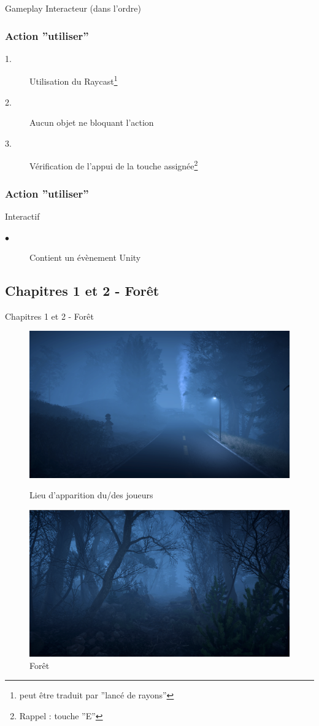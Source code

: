 \begin{frame}{Gameplay}
\setlength{\parindent}{5ex}
Interacteur (dans l'ordre)
\frametitle{Action ''utiliser''}
\begin{description}
  \item[1.] Utilisation du Raycast\footnote[1]{ peut être traduit par ''lancé de rayons''}
  \item[2.] Aucun objet ne bloquant l'action
  \item[3.] Vérification de l'appui de la touche assignée\footnote[2]{ Rappel : touche ''E''}
\end{description}
\frametitle{Action ''utiliser''}
\par Interactif
\begin{description}
  \item[$\bullet$] Contient un évènement Unity
\end{description}
\end{frame}

\subsection{Chapitres 1 et 2 - Forêt}
\begin{frame}{Chapitres 1 et 2 - Forêt}

\begin{figure}[H]
\centering
\begin{minipage}{.5\textwidth}
  \centering
  \includegraphics[width=.9\linewidth]{img/gameplay/hallo/spawn.png}
  \caption{Lieu d'apparition du/des joueurs}
  \label{fig:spawn}
\end{minipage}%
\begin{minipage}{.5\textwidth}
  \centering
  \includegraphics[width=.9\linewidth]{img/gameplay/hallo/forest.png}
  \caption{Forêt}
  \label{fig:forest}
\end{minipage}
\end{figure}
\end{frame}

